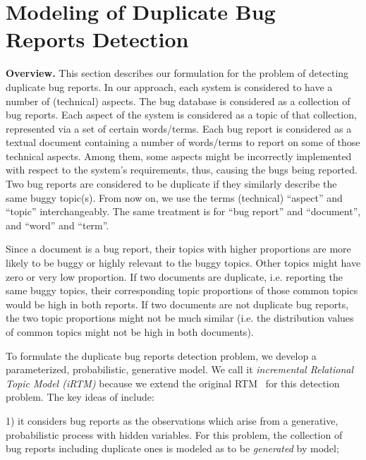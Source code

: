 \section{Modeling of Duplicate Bug Reports Detection}
\label{formulation}


\vspace{0.04in}
\noindent\textbf{Overview.} This section describes our formulation for
the problem of detecting duplicate bug reports. In our approach, each
system is considered to have a number of (technical) aspects. The bug
database is considered as a collection of bug reports. Each aspect of
the system is considered as a topic of that collection, represented
via a set of certain words/terms. Each bug report is considered as a
textual document containing a number of words/terms to report on some
of those technical aspects. Among them, some aspects might be
incorrectly implemented with respect to the system's requirements,
thus, causing the bugs being reported. Two bug reports are considered
to be duplicate if they similarly describe the same buggy
topic(s). From now on, we use the terms (technical) ``aspect'' and
``topic'' interchangeably. The same treatment is for ``bug report''
and ``document'', and ``word'' and ``term''.

Since a document is a bug report, their topics with higher proportions
are more likely to be buggy or highly relevant to the buggy
topics. Other topics might have zero or very low proportion. If two
documents are duplicate, i.e. reporting the same buggy topics, their
corresponding topic proportions of those common topics would be high
in both reports. If two documents are not duplicate bug reports, the
two topic proportions might not be much similar (i.e. the distribution
values of common topics might not be high in both documents).

To formulate the duplicate bug reports detection problem, we develop a
parameterized, probabilistic, generative model. We call it
\emph{incremental Relational Topic Model (iRTM)} because we extend the
original RTM~\cite{RTM} for this detection problem. The key ideas of
{\model} include:

1) it considers bug reports as the observations which arise from a
generative, probabilistic process with hidden variables. For this
problem, the collection of bug reports including duplicate ones is
modeled as to be {\em generated} by {\model} model;

